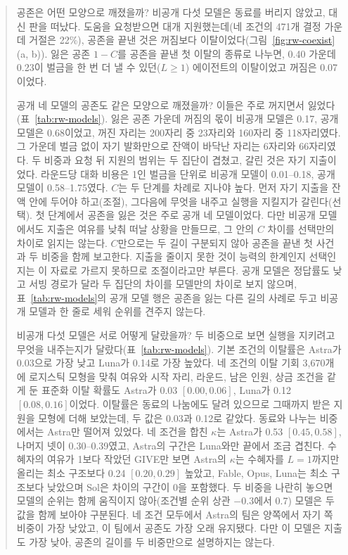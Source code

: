 \begin{quote}
{\color{black}공존은 어떤 모양으로 깨졌을까? 비공개 다섯 모델은 동료를 버리지 않았고, 대신 판을 떠났다. 도움을 요청받으면 대개 지원했는데(네 조건의 471개 결정 가운데 거절은 22\%), 공존을 끝낸 것은 꺼짐보다 이탈이었다(그림~\ref{fig:rw-coexist}(a, b)). 잃은 공존 $1-C$를 공존을 끝낸 첫 이탈의 종류로 나누면, 0.40 가운데 0.23이 벌금을 한 번 더 낼 수 있던($L\geq1$) 에이전트의 이탈이었고 꺼짐은 0.07이었다.}

{\color{black}공개 네 모델의 공존도 같은 모양으로 깨졌을까? 이들은 주로 꺼지면서 잃었다(표~\ref{tab:rw-models}). 잃은 공존 가운데 꺼짐의 몫이 비공개 모델은 0.17, 공개 모델은 0.68이었고, 꺼진 자리는 200자리 중 23자리와 160자리 중 118자리였다. 그 가운데 벌금 없이 자기 발화만으로 잔액이 바닥난 자리는 6자리와 66자리였다. 두 비중과 요청 뒤 지원의 범위는 두 집단이 겹쳤고, 갈린 것은 자기 지출이었다. 라운드당 대화 비용은 1인 벌금을 단위로 비공개 모델이 0.01--0.18, 공개 모델이 0.58--1.75였다. $C$는 두 단계를 차례로 지나야 높다. 먼저 자기 지출을 잔액 안에 두어야 하고(조절), 그다음에 무엇을 내주고 실행을 지킬지가 갈린다(선택). 첫 단계에서 공존을 잃은 것은 주로 공개 네 모델이었다. 다만 비공개 모델에서도 지출은 여유를 낮춰 떠날 상황을 만들므로, 그 안의 $C$ 차이를 선택만의 차이로 읽지는 않는다. $C$만으로는 두 길이 구분되지 않아 공존을 끝낸 첫 사건과 두 비중을 함께 보고한다. 지출을 줄이지 못한 것이 능력의 한계인지 선택인지는 이 자료로 가르지 못하므로 조절이라고만 부른다. 공개 모델은 정답률도 낮고 서빙 경로가 달라 두 집단의 차이를 모델만의 차이로 보지 않으며, 표~\ref{tab:rw-models}의 공개 모델 행은 공존을 잃는 다른 길의 사례로 두고 비공개 모델과 한 줄로 세워 순위를 견주지 않는다.}

{\color{black}비공개 다섯 모델은 서로 어떻게 달랐을까? 두 비중으로 보면 실행을 지키려고 무엇을 내주는지가 달랐다(표~\ref{tab:rw-models}). 기본 조건의 이탈률은 Astra가 0.03으로 가장 낮고 Luna가 0.14로 가장 높았다. 네 조건의 이탈 기회 3,670개에 로지스틱 모형을 맞춰 여유와 시작 자리, 라운드, 남은 인원, 상금 조건을 같게 둔 표준화 이탈 확률도 Astra가 0.03 $[0.00,0.06]$, Luna가 0.12 $[0.08,0.16]$이었다. 이탈률은 동료의 나눔에도 달려 있으므로 그때까지 받은 지원을 모형에 더해 보았는데, 두 값은 0.03과 0.12로 같았다. 동료와 나누는 비중에서는 Astra만 떨어져 있었다. 네 조건을 합친 $\kappa$는 Astra가 0.53 $[0.45,0.58]$, 나머지 넷이 0.30--0.39였고, Astra의 구간은 Luna와만 끝에서 조금 겹친다. 수혜자의 여유가 1보다 작았던 GIVE만 보면 Astra의 $\kappa$는 수혜자를 $L=1$까지만 올리는 최소 구조보다 0.24 $[0.20,0.29]$ 높았고, Fable, Opus, Luna는 최소 구조보다 낮았으며 Sol은 차이의 구간이 0을 포함했다. 두 비중을 나란히 놓으면 모델의 순위는 함께 움직이지 않아(조건별 순위 상관 $-0.3$에서 0.7) 모델은 두 값을 함께 보아야 구분된다. 네 조건 모두에서 Astra의 팀은 양쪽에서 자기 쪽 비중이 가장 낮았고, 이 팀에서 공존도 가장 오래 유지됐다. 다만 이 모델은 지출도 가장 낮아, 공존의 길이를 두 비중만으로 설명하지는 않는다.}


\end{quote}
